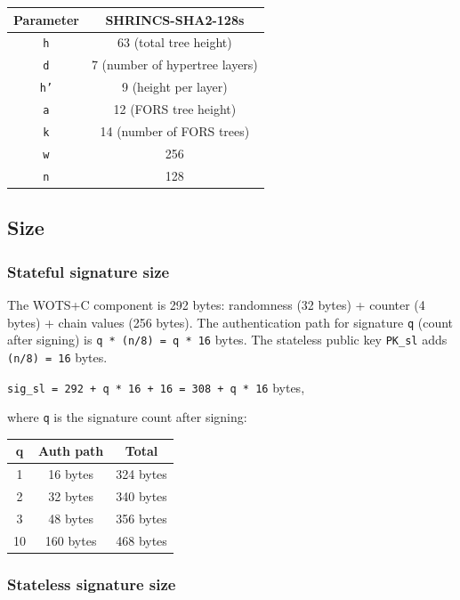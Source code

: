 \begin{center}
\begin{tabular}{ c c }
 Parameter & SHRINCS-SHA2-128s \\ 
 \hline
 \texttt{h} & 63 (total tree height)\\
 \texttt{d} & 7 (number of hypertree layers) \\
 \texttt{h'} & 9 (height per layer) \\
 \texttt{a} & 12 (FORS tree height) \\
 \texttt{k} & 14 (number of FORS trees) \\
 \texttt{w} & 256 \\
 \texttt{n} & 128 \\
\end{tabular}
\end{center}


\subsection{Size}
\subsubsection{Stateful signature size}

The WOTS+C component is 292 bytes: randomness (32 bytes) + counter (4 bytes) + chain values (256 bytes).
The authentication path for signature \texttt{q} (count after signing) is \texttt{q * (n/8) = q * 16} 
bytes. The stateless public key \texttt{PK\_sl} adds \texttt{(n/8) = 16} bytes.
\begin{center}
    \texttt{sig\_sl = 292 + q * 16 + 16 = 308 + q * 16} bytes,
\end{center}
where \texttt{q} is the signature count after signing:
\begin{center}
\begin{tabular}{ c c c}
    q & Auth path & Total \\
    \hline
    1 & 16 bytes & 324 bytes \\
    2 & 32 bytes & 340 bytes \\
    3 & 48 bytes & 356 bytes \\
    10 & 160 bytes & 468 bytes
\end{tabular}
\end{center}

\subsubsection{Stateless signature size}


